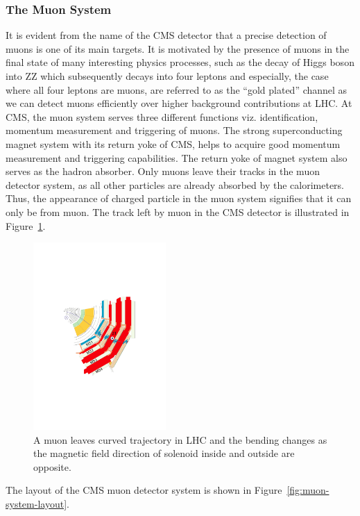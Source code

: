 \subsubsection{The Muon System} %
\label{sub:the_muon_system}
It is evident  from the name of the CMS detector that a precise detection of muons is one of its main targets. It is motivated by the presence of muons in the final state of many interesting physics processes, such as the decay of Higgs boson into ZZ which subsequently decays into four leptons and especially, the case where all four leptons are muons, are referred to as the ``gold plated'' channel as we can detect muons efficiently over higher background contributions at LHC. At CMS, the muon system serves three different functions viz. identification, momentum measurement and triggering of muons. The strong superconducting magnet system with its return yoke of CMS, helps to acquire good momentum measurement and triggering capabilities. The return yoke of magnet system also serves as the hadron absorber. Only muons leave their tracks in the muon detector system, as all other particles are already absorbed by the calorimeters. Thus, the appearance of charged particle in the muon system signifies that it can only be from muon. The track left by muon in the CMS detector is illustrated in Figure~\ref{fig:muon-system-cross}. 
\begin{figure}[!htbp]
	\centering
	\includegraphics[width=0.45\textwidth]{figures/LHC/MuStations.pdf}
	\caption{A muon leaves curved trajectory in LHC and the bending changes as the magnetic field direction of solenoid inside and outside are opposite.}
	\label{fig:muon-system-cross}
\end{figure}
The layout of the CMS muon detector system is shown in Figure~\ref{fig:muon-system-layout}.
